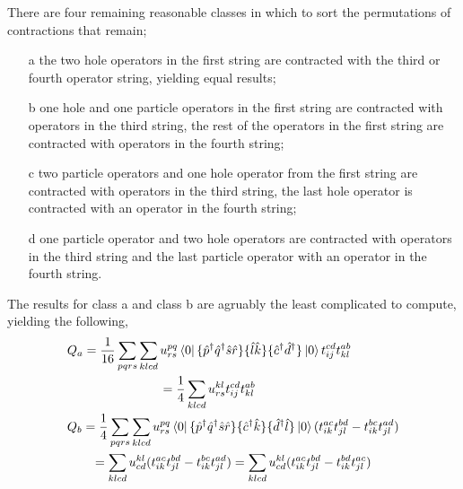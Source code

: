 There are four remaining reasonable classes in which to sort the
permutations of contractions that remain;
\begin{itemize}
    \item[a] the two hole operators in the first string are
    contracted with the third or fourth operator string, yielding 
    equal results;
    \item[b] one hole and one particle operators in the first string
    are contracted with operators in the third string, the rest of
    the operators in the first string are contracted with operators 
    in the fourth string;
    \item[c] two particle operators and one hole operator from the 
    first string are contracted with operators in the third string,
    the last hole operator is contracted with an operator in the 
    fourth string;
   \item[d] one particle operator and two hole operators are contracted 
    with operators in the third string and the last particle operator 
    with an operator in the fourth string.
\end{itemize}
The results for class a and class b are agruably the least complicated to 
compute, yielding the following,
\begin{align}
    &\begin{gathered}
        Q_a = \frac{1}{16}\sum_{pqrs}\sum_{klcd} 
        u^{pq}_{rs} \bra{0}
            \{\hat{p}^\dagger \hat{q}^\dagger \hat{s} \hat{r} \}
            \{\hat{l} \hat{k} \}
            \{\hat{c}^\dagger \hat{d}^\dagger \}
        \ket{0} t^{cd}_{ij} t^{ab}_{kl} \\
        = \frac{1}{4} \sum_{klcd}
        u^{kl}_{rs} t^{cd}_{ij} t^{ab}_{kl}
    \end{gathered} \\
    &\begin{gathered}
        Q_b = \frac{1}{4}\sum_{pqrs} \sum_{klcd}
        u^{pq}_{rs} \bra{0}
            \{\hat{p}^\dagger \hat{q}^\dagger \hat{s} \hat{r} \}
            \{\hat{c}^\dagger \hat{k} \}
            \{\hat{d}^\dagger \hat{l} \}
            \ket{0}
            (t^{ac}_{ik}t^{bd}_{jl} - t^{bc}_{ik}t^{ad}_{jl}) \\
        = \sum_{klcd} u^{kl}_{cd}
            (t^{ac}_{ik}t^{bd}_{jl} - t^{bc}_{ik}t^{ad}_{jl})
        = \sum_{klcd} u^{kl}_{cd}
            (t^{ac}_{ik}t^{bd}_{jl} - t^{bd}_{ik}t^{ac}_{jl})
    \end{gathered}
\end{align}

